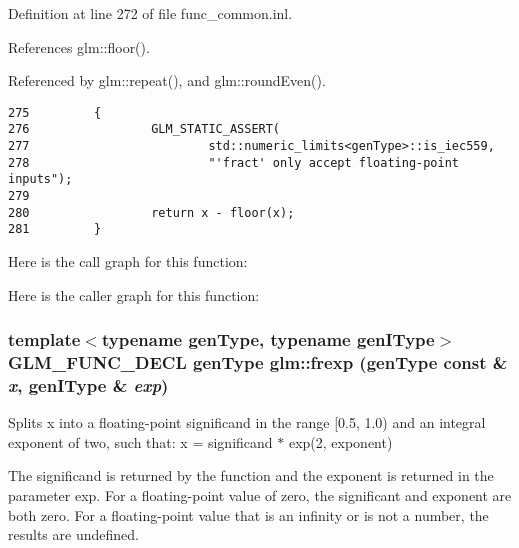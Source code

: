 Definition at line 272 of file func\_\-common.inl.

References glm::floor().

Referenced by glm::repeat(), and glm::roundEven().

\begin{Code}\begin{verbatim}275         {
276                 GLM_STATIC_ASSERT(
277                         std::numeric_limits<genType>::is_iec559,
278                         "'fract' only accept floating-point inputs");
279 
280                 return x - floor(x);
281         }
\end{verbatim}
\end{Code}




Here is the call graph for this function:

Here is the caller graph for this function:\hypertarget{group__core__func__common_g70c119cca554aacd36008191e2c4b2bb}{
\subsubsection[frexp]{\setlength{\rightskip}{0pt plus 5cm}template$<$typename genType, typename genIType$>$ GLM\_\-FUNC\_\-DECL genType glm::frexp (genType const \& {\em x}, \/  genIType \& {\em exp})}}
\label{group__core__func__common_g70c119cca554aacd36008191e2c4b2bb}


Splits x into a floating-point significand in the range \mbox{[}0.5, 1.0) and an integral exponent of two, such that: x = significand $\ast$ exp(2, exponent)

The significand is returned by the function and the exponent is returned in the parameter exp. For a floating-point value of zero, the significant and exponent are both zero. For a floating-point value that is an infinity or is not a number, the results are undefined.

